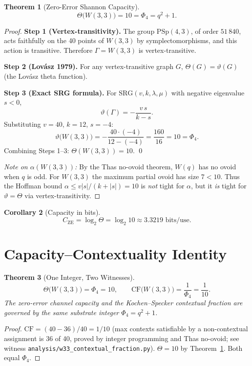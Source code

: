 \documentclass[11pt]{article}
\newtheorem{theorem}{Theorem}[section]
\newtheorem{corollary}[theorem]{Corollary}
\begin{document}
\begin{theorem}[Zero-Error Shannon Capacity]\label{thm:main}
\[
  \Theta\bigl(W(3,3)\bigr) = 10 = \Phi_4 = q^2+1.
\]
\end{theorem}

\begin{proof}
\textbf{Step 1 (Vertex-transitivity).}
The group $\mathrm{PSp}(4,3)$, of order $51\,840$, acts faithfully on the 40 points
of $W(3,3)$ by symplectomorphisms, and this action is transitive.
Therefore $\Gamma = W(3,3)$ is vertex-transitive.

\textbf{Step 2 (Lov\'asz 1979).}
For any vertex-transitive graph $G$, $\Theta(G) = \vartheta(G)$
(the Lov\'asz theta function).

\textbf{Step 3 (Exact SRG formula).}
For $\mathrm{SRG}(v,k,\lambda,\mu)$ with negative eigenvalue $s < 0$,
\[
  \vartheta(\Gamma) = -\frac{v\,s}{k-s}.
\]
Substituting $v=40$, $k=12$, $s=-4$:
\[
  \vartheta\bigl(W(3,3)\bigr) = -\frac{40\cdot(-4)}{12-(-4)} = \frac{160}{16} = 10 = \Phi_4.
\]
Combining Steps 1--3: $\Theta(W(3,3)) = 10$.  \qed

\emph{Note on $\alpha(W(3,3))$:} By the Thas no-ovoid theorem, $W(q)$ has no ovoid
when $q$ is odd. For $W(3,3)$ the maximum partial ovoid has size $7 < 10$.
Thus the Hoffman bound $\alpha \le v|s|/(k+|s|) = 10$ is \emph{not} tight for $\alpha$,
but it \emph{is} tight for $\vartheta = \Theta$ via vertex-transitivity.
\end{proof}

\begin{corollary}[Capacity in bits]
\[
  C_{\mathrm{ZE}} = \log_2 \Theta = \log_2 10 \approx 3.3219\text{ bits/use.}
\]
\end{corollary}

\section{Capacity--Contextuality Identity}

\begin{theorem}[One Integer, Two Witnesses]\label{thm:context}
\[
  \Theta\bigl(W(3,3)\bigr) = \Phi_4 = 10, \qquad
  \mathrm{CF}\bigl(W(3,3)\bigr) = \frac{1}{\Phi_4} = \frac{1}{10}.
\]
The zero-error channel capacity and the Kochen--Specker contextual fraction
are governed by the same substrate integer $\Phi_4 = q^2+1$.
\end{theorem}

\begin{proof}
$\mathrm{CF} = (40-36)/40 = 1/10$ (max contexts satisfiable by a non-contextual
assignment is 36 of 40, proved by integer programming and Thas no-ovoid;
see witness \texttt{analysis/w33\_contextual\_fraction.py}).
$\Theta = 10$ by Theorem~\ref{thm:main}. Both equal $\Phi_4$.
\end{proof}
\end{document}
